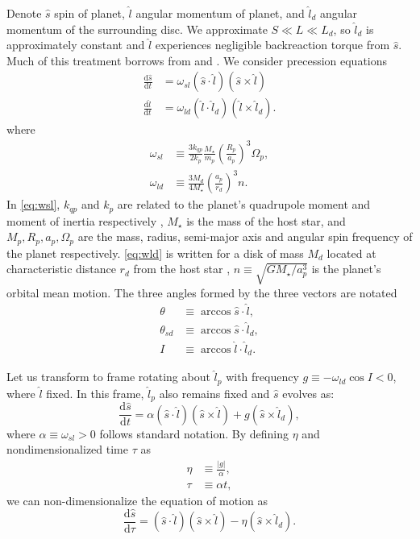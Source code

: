 \documentclass[
        fleqn,
        usenatbib,
    ]{mnras}
\newcommand*{\rd}[2]{\frac{\mathrm{d}#1}{\mathrm{d}#2}}
\newcommand*{\abs}[1]{\left|#1\right|}
\newcommand*{\p}[1]{\left(#1\right)}
\begin{document}
Denote $\hat{s}$ spin of planet, $\hat{l}$ angular momentum of planet, and
$\hat{l}_d$ angular momentum of the surrounding disc. We approximate $S \ll L
\ll L_d$, so $\hat{l}_d$ is approximately constant and $\hat{l}$ experiences
negligible backreaction torque from $\hat{s}$. Much of this treatment borrows
from \citealp{anderson2018teeter} and \citealp{millholland_disk}. We consider
precession equations
\begin{align}
    \rd{\hat{s}}{t} &= \omega_{sl} \p{\hat{s} \cdot \hat{l}}
        \p{\hat{s} \times \hat{l}}\label{eq:dsdt}\\
    \rd{\hat{l}}{t} &= \omega_{ld}\p{\hat{l} \cdot \hat{l}_d}
        \p{\hat{l} \times \hat{l}_d}\label{eq:dldt}.
\end{align}
where
\begin{align}
    \omega_{sl} &\equiv \frac{3k_{qp}}{2k_p} \frac{M_\star}{m_p}
        \p{\frac{R_p}{a_p}}^3 \Omega_p,\label{eq:wsl}\\
    \omega_{ld} &\equiv \frac{3M_d}{4M_\star}\p{\frac{a_p}{r_d}}^3 n
        .\label{eq:wld}
\end{align}
In \autoref{eq:wsl}, $k_{qp}$ and $k_p$ are related to the planet's quadrupole
moment and moment of inertia respectively \citep[see][]{lai2018}, $M_\star$ is
the mass of the host star, and $M_p, R_p, a_p, \Omega_p$ are the mass, radius,
semi-major axis and angular spin frequency of the planet respectively.
\autoref{eq:wld} is written for a disk of mass $M_d$ located at characteristic
distance $r_d$ from the host star \citep[see][for a power-law disk
profile]{millholland_disk}, $n \equiv \sqrt{GM_\star/a_p^3}$ is the planet's
orbital mean motion. The three angles formed by the three vectors are notated
\begin{align}
    \theta &\equiv \arccos \hat{s} \cdot \hat{l},\\
    \theta_{sd} &\equiv \arccos \hat{s} \cdot \hat{l}_d,\\
    I &\equiv \arccos \hat{l} \cdot \hat{l}_d.
\end{align}

Let us transform to frame rotating about $\hat{l}_p$ with frequency $g \equiv
-\omega_{ld}\cos I < 0$, where $\hat{l}$ fixed. In this frame, $\hat{l}_p$
also remains fixed and $\hat{s}$ evolves as:
\begin{equation}
    \rd{\hat{s}}{t} = \alpha \p{\hat{s} \cdot \hat{l}}
            \p{\hat{s} \times \hat{l}}
        + g\p{\hat{s} \times \hat{l}_d},
\end{equation}
where $\alpha \equiv \omega_{sl} > 0$ follows standard notation. By defining
$\eta$ and nondimensionalized time $\tau$ as
\begin{align}
    \eta &\equiv \frac{\abs{g}}{\alpha}\label{eq:eta},\\
    \tau &\equiv \alpha t,
\end{align}
we can non-dimensionalize the equation of motion as
\begin{equation}
    \rd{\hat{s}}{\tau} = \p{\hat{s} \cdot \hat{l}}
            \p{\hat{s} \times \hat{l}}
        - \eta\p{\hat{s} \times \hat{l}_d}. \label{eq:dsdt_base}
\end{equation}
\end{document}

